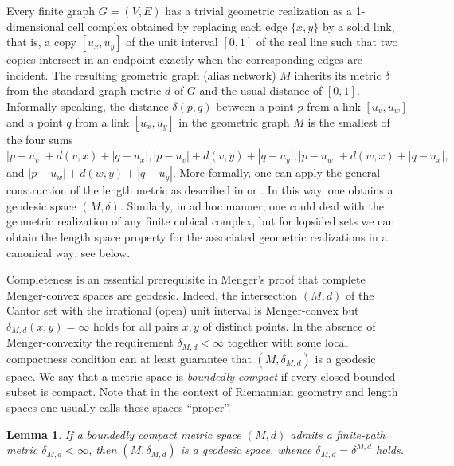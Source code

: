 \documentclass[11pt,a4paper]{amsart}
\newtheorem{lemma}{Lemma}
\theoremstyle{definition}
\numberwithin{equation}{section}
\newcommand{\MM}{\ensuremath{M}}
\begin{document}
Every finite graph $G=(V,E)$ has a trivial geometric realization as a  1-dimensional cell complex obtained by replacing each edge $\{ x,y\}$ by a solid link, that is, a
copy $[u_x,u_y]$ of the unit interval $[0,1]$ of the real line such that two copies intersect in an endpoint exactly when the corresponding edges are incident. The
resulting geometric graph (alias network) $\MM$ inherits its metric $\delta$ from the standard-graph metric $d$ of $G$ and the usual distance of $[0,1].$ Informally speaking,
the distance  $\delta(p,q)$ between a point $p$ from a link $[u_v,u_w]$ and a point $q$ from a link $[u_x,u_y]$ in the geometric graph $\MM$ is the smallest of the four sums
$|p-u_v|+d(v,x)+|q-u_x|, |p-u_v|+d(v,y)+|q-u_y|,|p-u_w|+d(w,x)+|q-u_x|,$  and  $|p-u_w|+d(w,y)+|q-u_y|.$ More formally, one can apply the general construction of the
length metric as described in \cite[Example 2.1.3(iv)]{Pa} or \cite[Section I.1.9]{BrHa}. In this way, one obtains a geodesic
space $(\MM,\delta).$ Similarly, in ad hoc manner, one could deal with the geometric realization of
any finite cubical complex, but for lopsided sets we can obtain the length space property for the associated geometric realizations in a canonical way; see below.

Completeness is an essential prerequisite in Menger's proof that complete Menger-convex spaces are geodesic. Indeed, the intersection
$(\MM,d)$ of the Cantor set with the irrational (open) unit interval is Menger-convex but $\delta_{\MM,d}(x,y)=\infty$ holds for all pairs $x,y$ of
distinct points. In the absence of Menger-convexity the requirement $\delta_{\MM,d}<\infty$ together with some local compactness condition can at
least guarantee that $(\MM,\delta_{\MM,d})$ is a geodesic space. We say that a metric space is {\it boundedly compact} if every closed bounded
subset is compact. Note that in the context of Riemannian geometry and length spaces one usually calls these spaces ``proper''.


\begin{lemma} \label{delta} If a boundedly compact metric space $(\MM,d)$ admits a finite-path metric $\delta_{\MM,d}<\infty$, then $(\MM,\delta_{\MM,d})$
is a geodesic space, whence $\delta_{\MM,d}=\delta^{\MM,d}$ holds.
\end{lemma}
\end{document}
